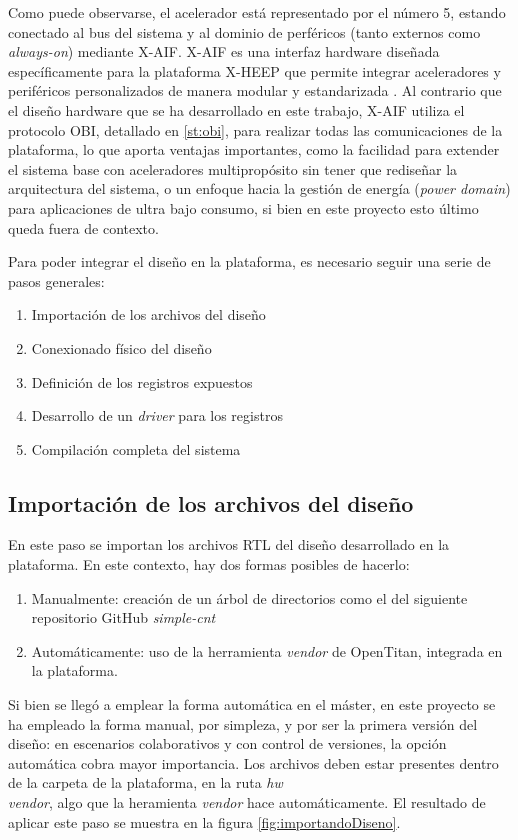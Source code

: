 Como puede observarse, el acelerador está representado por el número 5, estando conectado al bus del sistema y al dominio de perféricos (tanto externos como \textit{always-on}) mediante \ac{X-AIF}. X-AIF es una interfaz hardware diseñada específicamente para la plataforma X-HEEP que permite integrar aceleradores y periféricos personalizados de manera modular y estandarizada \cite{machetti2024xheep}. Al contrario que el diseño hardware que se ha desarrollado en este trabajo, X-AIF utiliza el protocolo \ac{OBI}, detallado en \ref{st:obi}, para realizar todas las comunicaciones de la plataforma, lo que aporta ventajas importantes, como la facilidad para extender el sistema base con aceleradores multipropósito sin tener que rediseñar la arquitectura del sistema, o un enfoque hacia la gestión de energía (\textit{power domain}) para aplicaciones de ultra bajo consumo, si bien en este proyecto esto último queda fuera de contexto. 

Para poder integrar el diseño en la plataforma, es necesario seguir una serie de pasos generales:

\begin{enumerate}
    \item Importación de los archivos del diseño
    \item Conexionado físico del diseño
    \item Definición de los registros expuestos
    \item Desarrollo de un \emph{driver} para los registros
    \item Compilación completa del sistema
\end{enumerate}

\subsection{Importación de los archivos del diseño}
En este paso se importan los archivos RTL del diseño desarrollado en la plataforma. En este contexto, hay dos formas posibles de hacerlo:

\begin{enumerate}
    \item Manualmente: creación de un árbol de directorios como el del siguiente repositorio GitHub \emph{simple-cnt} \cite{simple-cnt}
    \item Automáticamente: uso de la herramienta \emph{vendor} de OpenTitan, integrada en la plataforma.
\end{enumerate}

Si bien se llegó a emplear la forma automática en el máster, en este proyecto se ha empleado la forma manual, por simpleza, y por ser la primera versión del diseño: en escenarios colaborativos y con control de versiones, la opción automática cobra mayor importancia. Los archivos deben estar presentes dentro de la carpeta de la plataforma, en la ruta \emph{hw\\vendor}, algo que la heramienta \emph{vendor} hace automáticamente. El resultado de aplicar este paso se muestra en la figura \ref{fig:importandoDiseno}.

